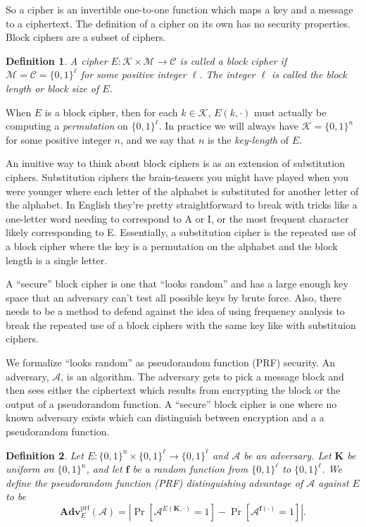 \documentclass[11pt]{article}
\newtheorem{definition}{Definition}
\newcommand{\msgs}{\mathcal{M}}
\newcommand{\ctxts}{\mathcal{C}}
\newcommand{\keys}{\mathcal{K}}
\newcommand{\calA}{\mathcal{A}}
\newcommand{\Adv}{\mathbf{Adv}}
\newcommand{\AdvPRF}[2]{\Adv^{\mathrm{prf}}_{#1}({#2})}
\newcommand{\bits}{\{0,1\}}
\newcommand{\bK}{\mathbf{K}}
\newcommand{\bof}{\mathbf{f}}
\begin{document}
	
	So a cipher is an invertible one-to-one function which maps a key and a message to a ciphertext. The definition of a cipher on its own has no security properties. Block ciphers are a subset of ciphers.
	\begin{definition}
		A cipher $E:\keys\times\msgs\to\ctxts$ is called a \emph{block cipher}
		if $\msgs=\ctxts=\bits^\ell$ for some positive integer $\ell$. The integer
		$\ell$ is called the \emph{block length} or \emph{block size} of $E$.
	\end{definition}
	When $E$ is a block cipher, then for each $k\in\keys$, $E(k,\cdot)$ must
	actually be computing a \emph{permutation} on $\bits^\ell$. In practice we will
	always have $\keys=\bits^n$ for some positive integer $n$, and we say that $n$
	is the \emph{key-length} of $E$.
	
	An inuitive way to think about block ciphers is as an extension of substitution ciphers. Substitution ciphers the brain-teasers you might have played when you were younger where each letter of the alphabet is substituted for another letter of the alphabet. In English they're pretty straightforward to break with tricks like a one-letter word needing to correspond to A or I, or the most frequent character likely corresponding to E. Essentially, a substitution cipher is the repeated use of a block cipher where the key is a permutation on the alphabet and the block length is a single letter.
	
	A ``secure'' block cipher is one that ``looks random'' and has a large enough key space that an adversary can't test all possible keys by brute force. Also, there needs to be a method to defend against the idea of using frequency analysis to break the repeated use of a block ciphers with the same key like with substituion ciphers.
	
	We formalize ``looks random'' as pseudorandom function (PRF) security. An adversary, $\calA$, is an algorithm. The adversary gets to pick a message block and then sees either the ciphertext which results from encrypting the block or the output of a pseudorandom function. A ``secure'' block cipher is one where no known adversary exists which can distinguish between encryption and a a pseudorandom function.
	
	\begin{definition}
		Let $E:\bits^n\times\bits^\ell\to\bits^\ell$ and $\calA$ be an adversary.
		Let $\bK$ be uniform on $\bits^n$, and let $\bof$ be a random function
		from $\bits^\ell$ to $\bits^\ell$.
		We define the \emph{pseudorandom function (PRF) distinguishing advantage
			of $\calA$ against $E$} to be
		\[
		\AdvPRF{E}{\calA} =
		\left|\Pr[\calA^{E(\bK,\cdot)}=1]-\Pr[\calA^{\bof(\cdot)}=1]\right|.
		\]
	\end{definition}
\end{document}
